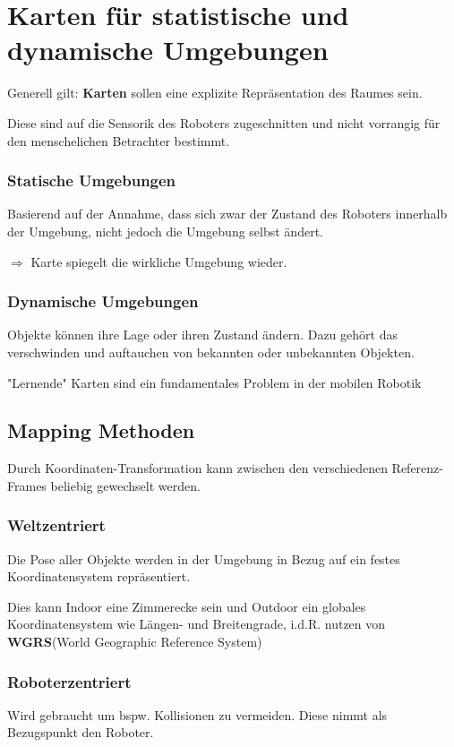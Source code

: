\section{Karten für statistische und dynamische Umgebungen}
Generell gilt: \textbf{Karten} sollen eine explizite Repräsentation des Raumes
sein.

Diese sind auf die Sensorik des Roboters zugeschnitten und nicht vorrangig für
den menschelichen Betrachter bestimmt.

\subsubsection*{Statische Umgebungen}
Basierend auf der Annahme, dass sich zwar der Zustand des Roboters innerhalb
der Umgebung, nicht jedoch die Umgebung selbst ändert.

$\Rightarrow$ Karte spiegelt die wirkliche Umgebung wieder.

\subsubsection*{Dynamische Umgebungen}
Objekte können ihre Lage oder ihren Zustand ändern. Dazu gehört das
verschwinden und auftauchen von bekannten oder unbekannten Objekten.

"Lernende" Karten sind ein fundamentales Problem in der mobilen Robotik

\subsection{Mapping Methoden}
Durch Koordinaten-Transformation kann zwischen den verschiedenen
Referenz-Frames beliebig ge\-wechselt werden.

\subsubsection{Weltzentriert}
Die Pose aller Objekte werden in der Umgebung in Bezug auf ein festes
Koordinatensystem repräsentiert.

Dies kann Indoor eine Zimmerecke sein und Outdoor ein globales
Koordinatensystem wie Längen- und Breitengrade, i.d.R. nutzen von
\textbf{WGRS}(World Geographic Reference System)

\subsubsection{Roboterzentriert}
Wird gebraucht um bspw. Kollisionen zu vermeiden. Diese nimmt als Bezugspunkt
den Roboter.


